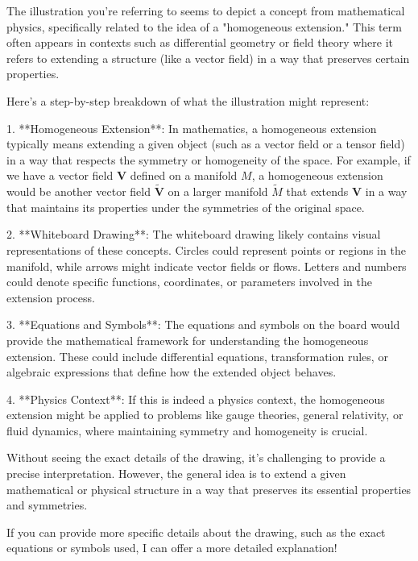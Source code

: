 The illustration you're referring to seems to depict a concept from mathematical physics, specifically related to the idea of a "homogeneous extension." This term often appears in contexts such as differential geometry or field theory where it refers to extending a structure (like a vector field) in a way that preserves certain properties.

Here's a step-by-step breakdown of what the illustration might represent:

1. **Homogeneous Extension**: In mathematics, a homogeneous extension typically means extending a given object (such as a vector field or a tensor field) in a way that respects the symmetry or homogeneity of the space. For example, if we have a vector field \( \mathbf{V} \) defined on a manifold \( M \), a homogeneous extension would be another vector field \( \tilde{\mathbf{V}} \) on a larger manifold \( \tilde{M} \) that extends \( \mathbf{V} \) in a way that maintains its properties under the symmetries of the original space.

2. **Whiteboard Drawing**: The whiteboard drawing likely contains visual representations of these concepts. Circles could represent points or regions in the manifold, while arrows might indicate vector fields or flows. Letters and numbers could denote specific functions, coordinates, or parameters involved in the extension process.

3. **Equations and Symbols**: The equations and symbols on the board would provide the mathematical framework for understanding the homogeneous extension. These could include differential equations, transformation rules, or algebraic expressions that define how the extended object behaves.

4. **Physics Context**: If this is indeed a physics context, the homogeneous extension might be applied to problems like gauge theories, general relativity, or fluid dynamics, where maintaining symmetry and homogeneity is crucial.

Without seeing the exact details of the drawing, it's challenging to provide a precise interpretation. However, the general idea is to extend a given mathematical or physical structure in a way that preserves its essential properties and symmetries.

If you can provide more specific details about the drawing, such as the exact equations or symbols used, I can offer a more detailed explanation!